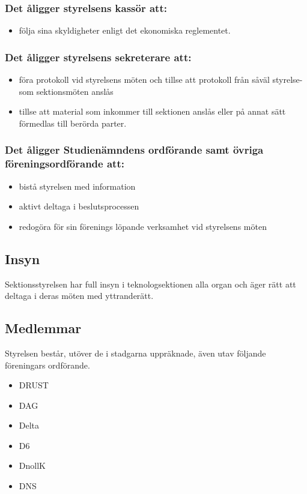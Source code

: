 \subsubsection{Det åligger styrelsens kassör att:}
\begin{itemize}
  \item följa sina skyldigheter enligt det ekonomiska reglementet. 
\end{itemize}
\subsubsection{Det åligger styrelsens sekreterare att:}
\begin{itemize}
  \item föra protokoll vid styrelsens möten och tillse att protokoll från såväl styrelse- som sektionsmöten anslås
  \item tillse att material som inkommer till sektionen anslås eller på annat sätt förmedlas till berörda parter.
\end{itemize}
\subsubsection{Det åligger Studienämndens ordförande samt övriga föreningsordförande att:}
\begin{itemize}
  \item bistå styrelsen med information 
  \item aktivt deltaga i beslutsprocessen 
  \item redogöra för sin förenings löpande verksamhet vid styrelsens möten 
\end{itemize}
\subsection{Insyn} 
Sektionsstyrelsen har full insyn i teknologsektionen alla organ och äger rätt att deltaga i deras möten med yttranderätt. 
\subsection{Medlemmar} 
Styrelsen består, utöver de i stadgarna uppräknade, även utav följande föreningars ordförande. 
\begin{itemize}
  \item DRUST 
  \item DAG 
  \item Delta 
  \item D6 
  \item DnollK 
  \item DNS
\end{itemize}
